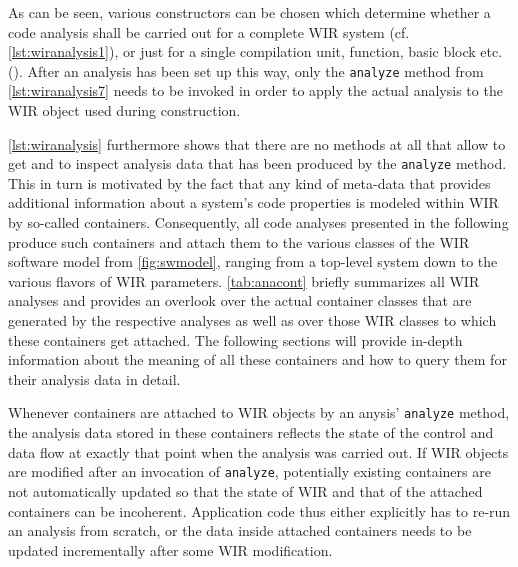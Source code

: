 As can be seen, various constructors can be chosen which determine whether a code analysis shall be carried out for a complete \gls{WIR} system (cf. \cref{lst:wiranalysis1}), or just for a single compilation unit, function, basic block etc. ().
After an analysis has been set up this way, only the \texttt{analyze} method from \cref{lst:wiranalysis7} needs to be invoked in order to apply the actual analysis to the \gls{WIR} object used during construction.

\cref{lst:wiranalysis} furthermore shows that there are no methods at all that allow to get and to inspect analysis data that has been produced by the \texttt{analyze} method.
This in turn is motivated by the fact that any kind of meta-data that provides additional information about a system's code properties is modeled within \gls{WIR} by so-called containers.
Consequently, all code analyses presented in the following produce such containers and attach them to the various classes of the \gls{WIR} software model from \cref{fig:swmodel}, ranging from a top-level system down to the various flavors of \gls{WIR} parameters.
\cref{tab:anacont} briefly summarizes all \gls{WIR} analyses and provides an overlook over the actual container classes that are generated by the respective analyses as well as over those \gls{WIR} classes to which these containers get attached.
The following sections will provide in-depth information about the meaning of all these containers and how to query them for their analysis data in detail.

\begin{wirNote}
  Whenever containers are attached to \gls{WIR} objects by an anysis' \texttt{analyze} method, the analysis data stored in these containers reflects the state of the control and data flow at exactly that point when the analysis was carried out.
  If \gls{WIR} objects are modified after an invocation of \texttt{analyze}, potentially existing containers are not automatically updated so that the state of \gls{WIR} and that of the attached containers can be incoherent.
  Application code thus either explicitly has to re-run an analysis from scratch, or the data inside attached containers needs to be updated incrementally after some \gls{WIR} modification.
\end{wirNote}

